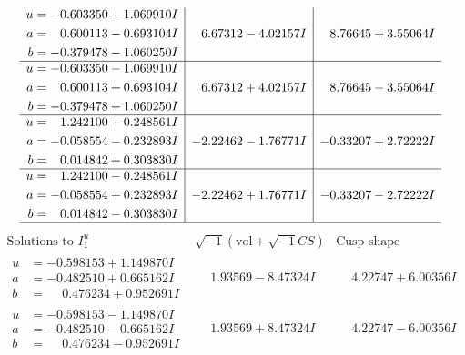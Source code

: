 \documentclass[1p]{elsarticle_modified}
\theoremstyle{definition}
\newcommand{\I}{\sqrt{-1}}
\begin{document}
$$\begin{array}{c|c|c}
\begin{aligned}
u &= -0.603350 + 1.069910 I \\
a &= \phantom{-}0.600113 - 0.693104 I \\
b &= -0.379478 - 1.060250 I\end{aligned}
 & \phantom{-}6.67312 - 4.02157 I & \phantom{-}8.76645 + 3.55064 I \\ \hline\begin{aligned}
u &= -0.603350 - 1.069910 I \\
a &= \phantom{-}0.600113 + 0.693104 I \\
b &= -0.379478 + 1.060250 I\end{aligned}
 & \phantom{-}6.67312 + 4.02157 I & \phantom{-}8.76645 - 3.55064 I \\ \hline\begin{aligned}
u &= \phantom{-}1.242100 + 0.248561 I \\
a &= -0.058554 - 0.232893 I \\
b &= \phantom{-}0.014842 + 0.303830 I\end{aligned}
 & -2.22462 - 1.76771 I & -0.33207 + 2.72222 I \\ \hline\begin{aligned}
u &= \phantom{-}1.242100 - 0.248561 I \\
a &= -0.058554 + 0.232893 I \\
b &= \phantom{-}0.014842 - 0.303830 I\end{aligned}
 & -2.22462 + 1.76771 I & -0.33207 - 2.72222 I\\
 \hline 
 \end{array}$$\newpage$$\begin{array}{c|c|c}  
\text{Solutions to }I^u_{1}& \I (\text{vol} + \sqrt{-1}CS) & \text{Cusp shape}\\
 \hline 
\begin{aligned}
u &= -0.598153 + 1.149870 I \\
a &= -0.482510 + 0.665162 I \\
b &= \phantom{-}0.476234 + 0.952691 I\end{aligned}
 & \phantom{-}1.93569 - 8.47324 I & \phantom{-}4.22747 + 6.00356 I \\ \hline\begin{aligned}
u &= -0.598153 - 1.149870 I \\
a &= -0.482510 - 0.665162 I \\
b &= \phantom{-}0.476234 - 0.952691 I\end{aligned}
 & \phantom{-}1.93569 + 8.47324 I & \phantom{-}4.22747 - 6.00356 I \\ \hline\begin{aligned}

\end{aligned}
\end{array}$$
\end{document}
